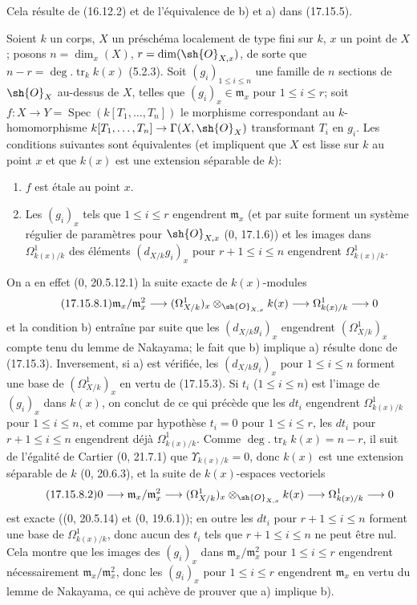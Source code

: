 Cela résulte de (16.12.2) et de l'équivalence de b) et a) dans (17.15.5).

\begin{proposition}[17.15.8]
\label{IV.17.15.8}
Soient $k$ un corps, $X$ un préschéma localement de type fini sur $k$, $x$ un point de $X$; posons $n=\dim_x(X)$, $r=\dim(\sh{O}_{X,x})$, de sorte que $n-r=\deg.\operatorname{tr}_k k(x)$ (5.2.3). Soit $(g_i)_{1\leq i\leq n}$ une famille de $n$ sections de $\sh{O}_X$ au-dessus de $X$, telles que $(g_i)_x\in\mathfrak m_x$ pour $1\leq i\leq r$; soit $f:X\to Y=\operatorname{Spec}(k[T_1,\ldots,T_n])$ le morphisme correspondant au $k$-homomorphisme $k[T_1,\ldots,T_n]\to\Gamma(X,\sh{O}_X)$ transformant $T_i$ en $g_i$. Les conditions suivantes sont équivalentes (et impliquent que $X$ est lisse sur $k$ au point $x$ et que $k(x)$ est une extension séparable de $k$):
\begin{enumerate}
  \item[a)] $f$ est étale au point $x$.


  \item[b)] Les $(g_i)_x$ tels que $1\leq i\leq r$ engendrent $\mathfrak m_x$ (et par suite forment un système régulier de paramètres pour $\sh{O}_{X,x}$ (0, 17.1.6)) et les images dans $\Omega^1_{k(x)/k}$ des éléments $(d_{X/k}g_i)_x$ pour $r+1\leq i\leq n$ engendrent $\Omega^1_{k(x)/k}$.
\end{enumerate}
\end{proposition}

On a en effet (0, 20.5.12.1) la suite exacte de $k(x)$-modules
\[
\label{IV.17.15.8.1}
\tag{17.15.8.1}
\mathfrak m_x/\mathfrak m_x^2\to(\Omega^1_{X/k})_x\otimes_{\sh{O}_{X,x}}k(x)\to\Omega^1_{k(x)/k}\to0
\]
et la condition b) entraîne par suite que les $(d_{X/k}g_i)_x$ engendrent $(\Omega^1_{X/k})_x$ compte tenu du lemme de Nakayama; le fait que b) implique a) résulte donc de (17.15.3). Inversement, si a) est vérifiée, les $(d_{X/k}g_i)_x$ pour $1\leq i\leq n$ forment une base de $(\Omega^1_{X/k})_x$ en vertu de (17.15.3). Si $t_i$ ($1\leq i\leq n$) est l'image de $(g_i)_x$ dans $k(x)$, on conclut de ce qui précède que les $dt_i$ engendrent $\Omega^1_{k(x)/k}$ pour $1\leq i\leq n$, et comme par hypothèse $t_i=0$ pour $1\leq i\leq r$, les $dt_i$ pour $r+1\leq i\leq n$ engendrent déjà $\Omega^1_{k(x)/k}$. Comme $\deg.\operatorname{tr}_k k(x)=n-r$, il suit de l'égalité de Cartier (0, 21.7.1) que $\Upsilon_{k(x)/k}=0$, donc $k(x)$ est une extension séparable de $k$ (0, 20.6.3), et la suite de $k(x)$-espaces vectoriels
\[
\label{IV.17.15.8.2}
\tag{17.15.8.2}
0\to\mathfrak m_x/\mathfrak m_x^2\to(\Omega^1_{X/k})_x\otimes_{\sh{O}_{X,x}}k(x)\to\Omega^1_{k(x)/k}\to0
\]
est exacte ((0, 20.5.14) et (0, 19.6.1)); en outre les $dt_i$ pour $r+1\leq i\leq n$ forment une base de $\Omega^1_{k(x)/k}$, donc aucun des $t_i$ tels que $r+1\leq i\leq n$ ne peut être nul. Cela montre que les images des $(g_i)_x$ dans $\mathfrak m_x/\mathfrak m_x^2$ pour $1\leq i\leq r$ engendrent nécessairement $\mathfrak m_x/\mathfrak m_x^2$, donc les $(g_i)_x$ pour $1\leq i\leq r$ engendrent $\mathfrak m_x$ en vertu du lemme de Nakayama, ce qui achève de prouver que a) implique b).

